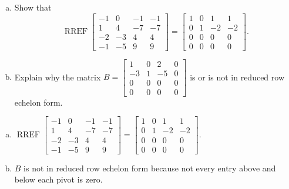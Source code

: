 
\begin{exerciseStatement}

\begin{enumerate}[(a)]
\item Show that \[\operatorname{RREF} \left[\begin{array}{cccc}
-1 & 0 & -1 & -1 \\
1 & 4 & -7 & -7 \\
-2 & -3 & 4 & 4 \\
-1 & -5 & 9 & 9
\end{array}\right] = \left[\begin{array}{cccc}
1 & 0 & 1 & 1 \\
0 & 1 & -2 & -2 \\
0 & 0 & 0 & 0 \\
0 & 0 & 0 & 0
\end{array}\right] .\]
\item Explain why the matrix \(B= \left[\begin{array}{cccc}
1 & 0 & 2 & 0 \\
-3 & 1 & -5 & 0 \\
0 & 0 & 0 & 0 \\
0 & 0 & 0 & 0
\end{array}\right] \) is or is not in reduced row echelon form.
\end{enumerate}
    
\end{exerciseStatement}
    
\begin{exerciseAnswer} 

\begin{enumerate}[(a)]
\item \(\operatorname{RREF} \left[\begin{array}{cccc}
-1 & 0 & -1 & -1 \\
1 & 4 & -7 & -7 \\
-2 & -3 & 4 & 4 \\
-1 & -5 & 9 & 9
\end{array}\right] = \left[\begin{array}{cccc}
1 & 0 & 1 & 1 \\
0 & 1 & -2 & -2 \\
0 & 0 & 0 & 0 \\
0 & 0 & 0 & 0
\end{array}\right] .\)
\item \(B\) is not in reduced row echelon form because not every entry above and below each pivot is zero. 
\end{enumerate}
    
\end{exerciseAnswer}
    
